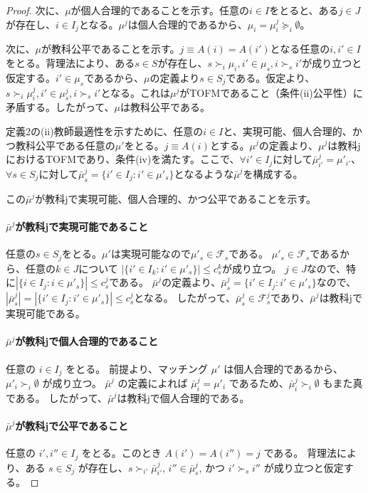 \documentclass[12pt, a4paper]{article}
\theoremstyle{definition}
\theoremstyle{remark}
\theoremstyle{plain}
\begin{document}
\begin{proof}
次に、$\mu$が個人合理的であることを示す。任意の$i \in I$をとると、ある$j \in J$が存在し、$i \in I_j$となる。$\mu^j$は個人合理的であるから、$\mu_i = \mu^j_i \succeq_i \emptyset$。

次に、$\mu$が教科公平であることを示す。$j \equiv A(i) = A(i')$となる任意の$i,i' \in I$をとる。背理法により、ある$s \in S$が存在し、$s \succ_i \mu_i, i' \in \mu_s, i \succ_s i'$が成り立つと仮定する。$i' \in \mu_s$であるから、$\mu$の定義より$s \in S_j$である。仮定より、$s \succ_i \mu^j_i, i' \in \mu^j_s, i \succ_s i'$となる。これは$\mu^j$がTOFMであること（条件(ii)公平性）に矛盾する。したがって、$\mu$は教科公平である。


定義2の(ii)教師最適性を示すために、任意の$i \in I$と、実現可能、個人合理的、かつ教科公平である任意の$\mu'$をとる。$j \equiv A(i)$とする。$\mu^j$の定義より、$\mu^j$は教科jにおけるTOFMであり、条件(iv)を満たす。ここで、$\forall i' \in I_j$に対して$\bar{\mu}^j_{i'} = \mu'_{i'}$、$\forall s \in S_j$に対して$\bar{\mu}^j_s = \{ i' \in I_j : i' \in \mu'_s\}$となるような$\bar{\mu}^j$を構成する。

この$\bar{\mu}^j$が教科jで実現可能、個人合理的、かつ公平であることを示す。

\paragraph{$\bar{\mu}^j$が教科jで実現可能であること}
任意の$s \in S_j$をとる。$\mu'$は実現可能なので$\mu'_s \in \mathcal{F}_s$である。
$\mu'_s \in \mathcal{F}_s$であるから、任意の$k \in J$について $|\{i' \in I_k : i' \in \mu'_s\}| \leq c^k_s$が成り立つ。
$j \in J$なので、特に$|\{i \in I_j : i \in \mu'_s\}| \leq c^j_s$である。
$\bar{\mu}^j$の定義より、$\bar{\mu}^j_s = \{ i' \in I_j : i' \in \mu'_s\}$なので、
$|\bar{\mu}^j_s| = |\{ i' \in I_j : i' \in \mu'_s\}| \leq c^j_s$となる。
したがって、$\bar{\mu}^j_s \in \mathcal{F}^j_s$であり、$\bar{\mu}^j$は教科jで実現可能である。

\paragraph{$\bar{\mu}^j$が教科jで個人合理的であること}
任意の $i \in I_j$ をとる。
前提より、マッチング $\mu'$ は個人合理的であるから、$\mu'_{i} \succ_{i} \emptyset$ が成り立つ。
$\bar{\mu}^j$ の定義によれば $\bar{\mu}^j_{i} = \mu'_{i}$ であるため、$\bar{\mu}^j_{i} \succ_{i} \emptyset$ もまた真である。
したがって、$\bar{\mu}^j$は教科jで個人合理的である。

\paragraph{$\bar{\mu}^j$が教科jで公平であること}
任意の $i', i'' \in I_j$ をとる。このとき $A(i')=A(i'')=j$ である。
背理法により、ある $s \in S_j$ が存在し、$s \succ_{i'} \bar{\mu}^j_{i'}$, $i'' \in \bar{\mu}^j_s$, かつ $i' \succ_s i''$ が成り立つと仮定する。


\end{proof}
\end{document}
